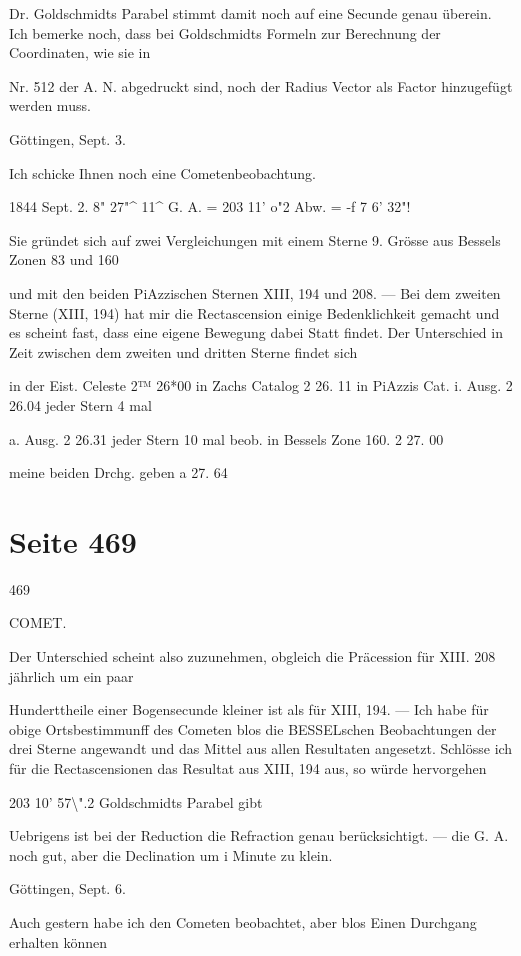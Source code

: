 \documentclass[10pt,a4paper]{article}
\begin{document}
Dr. Goldschmidts Parabel stimmt damit noch auf eine Secunde genau überein. Ich bemerke noch, dass bei Goldschmidts Formeln zur Berechnung der Coordinaten, wie sie in

Nr. 512 der A. N. abgedruckt sind, noch der Radius Vector als Factor hinzugefügt werden muss.

Göttingen, Sept. 3.

Ich schicke Ihnen noch eine Cometenbeobachtung.

1844 Sept. 2. 8" 27"\textasciicircum{} 11\textasciicircum{} G. A. = 203\textdegree{} 11' o"2 Abw. = -f 7\textdegree{} 6' 32"!

Sie gründet sich auf zwei Vergleichungen mit einem Sterne 9. Grösse aus Bessels Zonen 83 und 160

und mit den beiden PiAzzischen Sternen XIII, 194 und 208. — Bei dem zweiten Sterne (XIII, 194) hat mir die Rectascension einige Bedenklichkeit gemacht und es scheint fast, dass eine eigene Bewegung dabei Statt findet. Der Unterschied in Zeit zwischen dem zweiten und dritten Sterne findet sich

in der Eist. Celeste 2™ 26*00 in Zachs Catalog 2 26. 11 in PiAzzis Cat. i. Ausg. 2 26.04 jeder Stern 4 mal

a. Ausg. 2 26.31 jeder Stern 10 mal beob. in Bessels Zone 160. 2 27. 00

meine beiden Drchg. geben a 27. 64


\newpage
\section*{Seite 469}
469

COMET.

Der Unterschied scheint also zuzunehmen, obgleich die Präcession für XIII. 208 jährlich um ein paar

Hunderttheile einer Bogensecunde kleiner ist als für XIII, 194. — Ich habe für obige Ortsbestimmunff des Cometen blos die BESSELschen Beobachtungen der drei Sterne angewandt und das Mittel aus allen Resultaten angesetzt. Schlösse ich für die Rectascensionen das Resultat aus XIII, 194 aus, so würde hervorgehen

203\textdegree{} 10' 57\textbackslash{}".2 Goldschmidts Parabel gibt

Uebrigens ist bei der Reduction die Refraction genau berücksichtigt. — die G. A. noch gut, aber die Declination um i Minute zu klein.

Göttingen, Sept. 6.

Auch gestern habe ich den Cometen beobachtet, aber blos Einen Durchgang erhalten können
\end{document}
